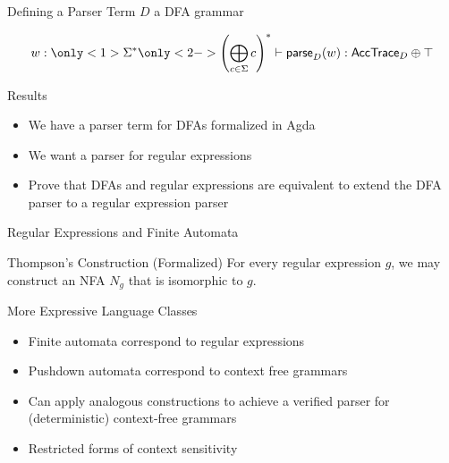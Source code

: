 \documentclass[10pt]{beamer}
\makeatletter
\newif\ifdraft
\newcommand{\todoin}[1]{\ifdraft{\todo[inline]{TODO:\@ #1}}\fi}
\makeatother
\begin{document}
\begin{frame}{Defining a Parser Term}
  $D$ a DFA grammar

  \[ w : \only<1>{\Sigma^{*}}\only<2->{\left( \bigoplus_{c \in \Sigma} c \right)^{*}} \vdash \mathsf{parse}_{D}(w) : \mathsf{AccTrace}_{D} \oplus \top \]


  \todoin{This slide is choppy and the bigoplus is confusing. Needs graphics}
\end{frame}

\begin{frame}{Results}
  \begin{itemize}
    \item<+-> We have a parser term for DFAs formalized in Agda
    \item<+-> We want a parser for regular expressions
    \item<+-> Prove that DFAs and regular expressions are equivalent to extend the DFA parser to a regular expression parser
  \end{itemize}
\end{frame}

\begin{frame}{Regular Expressions and Finite Automata}
  \begin{block}{Thompson's Construction (Formalized)}
    For every regular expression $g$, we may construct an NFA $N_{g}$ that is isomorphic to $g$.
  \end{block}


\end{frame}

\begin{frame}{More Expressive Language Classes}
  \begin{itemize}
    \item Finite automata correspond to regular expressions
    \item<+-> Pushdown automata correspond to context free grammars
    \item<+-> Can apply analogous constructions to achieve a verified parser for
          (deterministic) context-free grammars
    \item<+-> Restricted forms of context sensitivity
  \end{itemize}
\end{frame}
\end{document}
